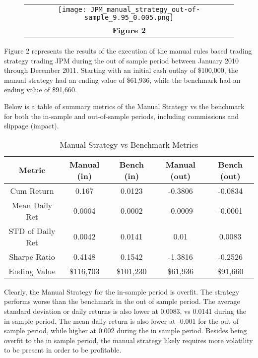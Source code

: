 \documentclass[
	letterpaper, %
]{jdf}
\begin{document}
\pagebreak


\begin{figure}[h]
	\begin{tabular}{c}
		\texttt{[image: JPM\_manual\_strategy\_out-of-sample\_9.95\_0.005.png]} \\
		\textbf{Figure 2} \\
	\end{tabular}
\end{figure}

Figure 2 represents the results of the execution of the manual rules based trading strategy trading JPM during the out of sample period between January 2010 through December 2011.  Starting with an initial cash outlay of \$100,000, the manual strategy had an ending value of \$61,936, while the benchmark had an ending value of \$91,660.
 
\pagebreak

Below is a table of summary metrics of the Manual Strategy vs the benchmark for both the in-sample and out-of-sample periods, including commissions and slippage (impact).

\begin{table}[h]
\centering
\begin{tabular}{ c | c | c | c | c}
  \hline
  Metric & Manual (in) & Bench (in) & Manual (out) & Bench (out) \\
  \hline   
 
Cum Return & 0.167 & 0.0123 & -0.3806 & -0.0834 \\
Mean Daily Ret & 0.0004 & 0.0002 & -0.0009 & -0.0001 \\
STD of Daily Ret & 0.0042 & 0.0141 & 0.01 & 0.0083 \\
Sharpe Ratio & 0.4148 & 0.1542 & -1.3816 & -0.2526 \\
Ending Value & \$116,703 & \$101,230 & \$61,936 & \$91,660 \\
  \hline
\end{tabular}
\caption{Manual Strategy vs Benchmark Metrics}
\label{tbl:topic_overlap}
\end{table}

Clearly, the Manual Strategy for the in-sample period is overfit.  The strategy performs worse than the benchmark in the out of sample period.  The average standard deviation or daily returns is also lower at 0.0083, vs 0.0141 during the in sample period.  The mean daily return is also lower at -0.001 for the out of sample period, while higher at 0.002 during the in sample period.  Besides being overfit to the in sample period, the manual strategy likely requires more volatility to be present in order to be profitable.
\end{document}
